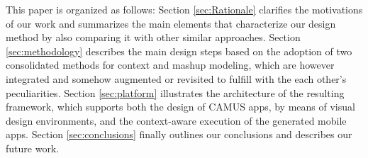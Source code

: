 This paper is organized as follows: Section \ref{sec:Rationale} clarifies the motivations of our work and summarizes the main elements that characterize our design method by also comparing it with other similar approaches. Section \ref{sec:methodology} describes the main design steps based on the adoption of two consolidated methods for context and mashup modeling, which are however integrated and somehow augmented or revisited to fulfill with the each other's peculiarities. Section \ref{sec:platform} illustrates the architecture of the resulting framework, which supports both the design of CAMUS apps, by means of visual design environments, and the context-aware execution of the generated mobile apps. Section \ref{sec:conclusions} finally outlines our conclusions and describes our future work.


